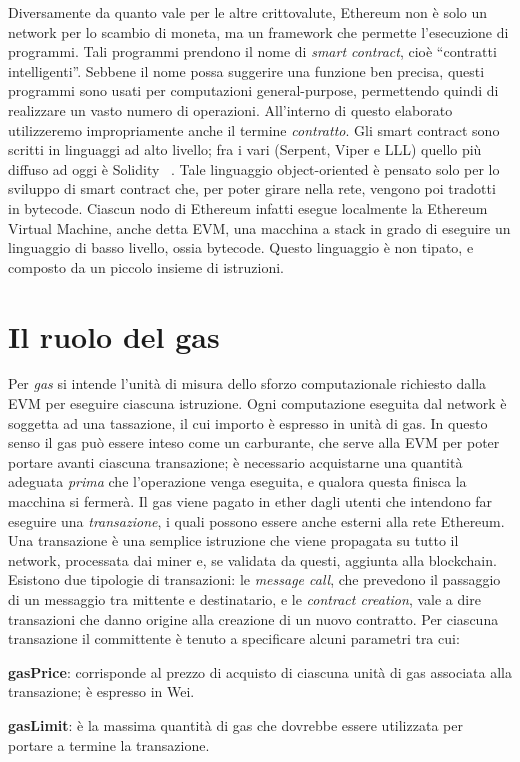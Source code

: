 \indent Diversamente da quanto vale per le altre crittovalute, Ethereum non è solo un network per lo scambio di moneta, ma un framework che permette l'esecuzione di programmi. Tali programmi prendono il nome di \textit{smart contract}, cioè ``contratti intelligenti''. Sebbene il nome possa suggerire una funzione ben precisa, questi programmi sono usati per computazioni general-purpose, permettendo quindi di realizzare un vasto numero di operazioni. All'interno di questo elaborato utilizzeremo impropriamente anche il termine \textit{contratto}.\newline
\indent Gli smart contract sono scritti in linguaggi ad alto livello; fra i vari (Serpent, Viper e LLL) quello più diffuso ad oggi è Solidity ~\cite{ethereum/solidity_2019}.  Tale linguaggio object-oriented è pensato solo per lo sviluppo di smart contract che, per poter girare nella rete, vengono poi tradotti in bytecode. Ciascun nodo di Ethereum infatti esegue localmente la Ethereum Virtual Machine, anche detta EVM, una macchina a stack in grado di eseguire un linguaggio di basso livello, ossia bytecode. Questo linguaggio è non tipato, e composto da un piccolo insieme di istruzioni.\newline 

\section{Il ruolo del gas}

Per \textit{gas} si intende l'unità di misura dello sforzo computazionale richiesto dalla EVM per eseguire ciascuna istruzione. Ogni computazione eseguita dal network è 
soggetta ad una tassazione, il cui importo è espresso in
unità di gas. In questo senso il gas può essere inteso come
un carburante, che serve alla EVM per poter portare avanti ciascuna transazione; è necessario acquistarne una quantità adeguata \textit{prima} che l'operazione venga eseguita, e qualora questa finisca la macchina si fermerà.\newline
\indent Il gas viene pagato in ether dagli utenti che intendono far eseguire una \textit{transazione}, i quali possono essere anche esterni alla rete Ethereum. Una transazione è una semplice istruzione che viene propagata su tutto il network, processata dai miner e, se validata da questi, aggiunta alla blockchain. Esistono due tipologie di transazioni: le \textit{message call}, che prevedono il passaggio di un messaggio tra mittente e destinatario, e le \textit{contract creation}, vale a dire transazioni che danno origine alla creazione di un nuovo contratto. Per ciascuna transazione il committente è tenuto a specificare alcuni parametri tra cui:
\begin{description}
 \item \textbf{gasPrice}: corrisponde al prezzo di acquisto di ciascuna unità di gas associata alla transazione; è espresso in Wei.
 \item \textbf{gasLimit}: è la massima quantità di gas che dovrebbe essere utilizzata per portare a termine la transazione.
\end{description}

